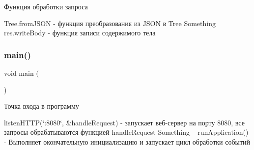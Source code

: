 Функция обработки запроса 

Tree.\+from\+J\+S\+ON -\/ функция преобразования из J\+S\+ON в Tree Something ~\newline
 res.\+write\+Body -\/ функция записи содержимого тела \mbox{\label{app_8d_acdef7a1fd863a6d3770c1268cb06add3}} 
\subsubsection{\texorpdfstring{main()}{main()}}
{\footnotesize\ttfamily void main (\begin{DoxyParamCaption}{ }\end{DoxyParamCaption})}



Точка входа в программу 

listen\+H\+T\+TP(\char`\"{}\+:8080\char`\"{}, \&handle\+Request) -\/ запускает веб-\/сервер на порту 8080, все запросы обрабатываются функцией handle\+Request Something ~\newline
 run\+Application() -\/ Выполняет окончательную инициализацию и запускает цикл обработки событий 
